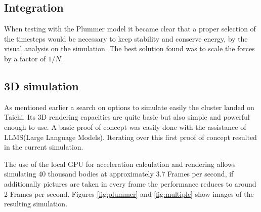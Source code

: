 \documentclass[a4paper, 11pt]{article}         %
\begin{document}
\subsection{Integration}
When testing with the Plummer model it became clear that a proper selection of the timesteps would be necessary
to keep stability and conserve energy, by the visual analysis on the simulation.
The best solution found was to scale the forces by a factor of $1/N$.

\subsection{3D simulation}
As mentioned earlier a search on options to simulate easily the cluster landed on Taichi. Its 3D rendering capacities are quite basic but also simple and powerful enough to use.
A basic proof of concept was easily done with the assistance of LLMS(Large Language Models). Iterating over this first proof of concept resulted in the current simulation.

The use of the local GPU for acceleration calculation and rendering allows simulating 40 thousand bodies at approximately 3.7 Frames per second, if additionally pictures are taken in every frame the performance reduces to around 2 Frames per second. Figures \ref{fig:plummer} and \ref{fig:multiple} show images of the resulting simulation. 
\end{document}
